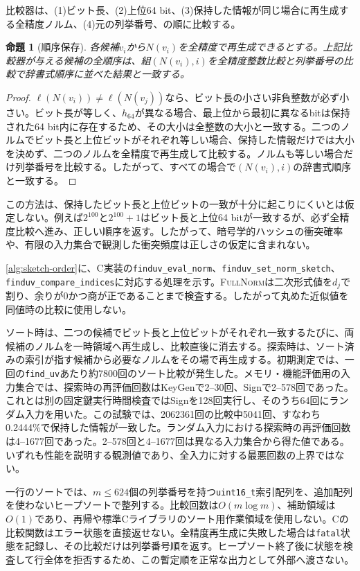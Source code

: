 \documentclass[a4paper,10pt]{ltjsarticle}
\newtheorem{proposition}{命題}
\theoremstyle{definition}
\theoremstyle{remark}
\begin{document}
比較器は、(1)ビット長、(2)上位64 bit、(3)保持した情報が同じ場合に再生成する全精度ノルム、(4)元の列挙番号、の順に比較する。

\begin{proposition}[順序保存]
\label{prop:order-preservation}
各候補$v_i$から$N(v_i)$を全精度で再生成できるとする。上記比較器が与える候補の全順序は、組$(N(v_i),i)$を全精度整数比較と列挙番号の比較で辞書式順序に並べた結果と一致する。
\end{proposition}

\begin{proof}
$\ell(N(v_i))\neq\ell(N(v_j))$なら、ビット長の小さい非負整数が必ず小さい。ビット長が等しく、$h_{64}$が異なる場合、最上位から最初に異なるbitは保持された64 bit内に存在するため、その大小は全整数の大小と一致する。二つのノルムでビット長と上位ビットがそれぞれ等しい場合、保持した情報だけでは大小を決めず、二つのノルムを全精度で再生成して比較する。ノルムも等しい場合だけ列挙番号を比較する。したがって、すべての場合で$(N(v_i),i)$の辞書式順序と一致する。
\end{proof}

この方法は、保持したビット長と上位ビットの一致が十分に起こりにくいとは仮定しない。例えば$2^{100}$と$2^{100}+1$はビット長と上位64 bitが一致するが、必ず全精度比較へ進み、正しい順序を返す。したがって、暗号学的ハッシュの衝突確率や、有限の入力集合で観測した衝突頻度は正しさの仮定に含まれない。

\cref{alg:sketch-order}に、C実装の\texttt{finduv\_eval\_norm}、\texttt{finduv\_set\_norm\_sketch}、\texttt{finduv\_compare\_indices}に対応する処理を示す。\textsc{FullNorm}は二次形式値を$d_j$で割り、余りが0かつ商が正であることまで検査する。したがって丸めた近似値を同値時の比較に使用しない。

ソート時は、二つの候補でビット長と上位ビットがそれぞれ一致するたびに、両候補のノルムを一時領域へ再生成し、比較直後に消去する。探索時は、ソート済みの索引が指す候補から必要なノルムをその場で再生成する。初期測定では、一回の\texttt{find\_uv}あたり約\num{7800}回のソート比較が発生した。メモリ・機能評価用の入力集合では、探索時の再評価回数はKeyGenで2--30回、Signで2--578回であった。これとは別の固定鍵実行時間検査ではSignを128回実行し、そのうち64回にランダム入力を用いた。この試験では、\num{2062361}回の比較中\num{5041}回、すなわち\num{0.2444}\%で保持した情報が一致した。ランダム入力における探索時の再評価回数は4--1677回であった。2--578回と4--1677回は異なる入力集合から得た値である。いずれも性能を説明する観測値であり、全入力に対する最悪回数の上界ではない。

一行のソートでは、$m\leq624$個の列挙番号を持つ\texttt{uint16\_t}索引配列を、追加配列を使わないヒープソートで整列する。比較回数は$O(m\log m)$、補助領域は$O(1)$であり、再帰や標準Cライブラリのソート用作業領域を使用しない。Cの比較関数はエラー状態を直接返せない。全精度再生成に失敗した場合は\texttt{fatal}状態を記録し、その比較だけは列挙番号順を返す。ヒープソート終了後に状態を検査して行全体を拒否するため、この暫定順を正常な出力として外部へ渡さない。
\end{document}
